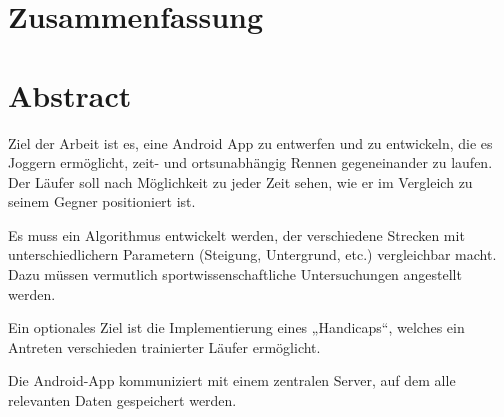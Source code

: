 \section*{Zusammenfassung}



%


\section*{Abstract}

Ziel der Arbeit ist es, eine Android App zu entwerfen und zu entwickeln, die es Joggern ermöglicht, zeit- und ortsunabhängig Rennen gegeneinander zu laufen. Der Läufer soll nach Möglichkeit zu jeder Zeit 
sehen, wie er im Vergleich zu seinem Gegner positioniert ist. 

Es muss ein Algorithmus entwickelt werden, der verschiedene Strecken mit unterschiedlichern 
Parametern (Steigung, Untergrund, etc.) vergleichbar macht. Dazu müssen vermutlich 
sportwissenschaftliche Untersuchungen angestellt werden. 

Ein optionales Ziel ist die Implementierung eines „Handicaps“, welches ein Antreten verschieden 
trainierter Läufer ermöglicht. 

Die Android-App kommuniziert mit einem zentralen Server, auf dem alle relevanten Daten gespeichert werden. 
